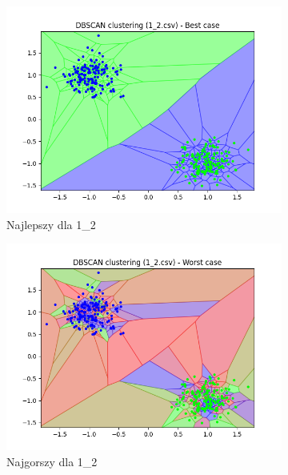 \documentclass[12pt]{article}
\begin{document}
\begin{figure}[H]
\begin{subfigure}[b]{0.24\textwidth}
        \includegraphics[width=\linewidth]{img/exp_2/dbscan/1_2_best.png}
        \caption{Najlepszy dla 1\_2}
    \end{subfigure}
    \hfill
    \begin{subfigure}[b]{0.24\textwidth}
        \includegraphics[width=\linewidth]{img/exp_2/dbscan/1_2_worst.png}
        \caption{Najgorszy dla 1\_2}
    \end{subfigure}
    \begin{subfigure}[b]{0.24\textwidth}

\end{subfigure}
\end{figure}
\end{document}
